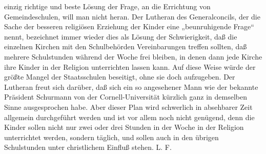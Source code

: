 einzig richtige und beste Lösung der Frage, an die Errichtung von Gemeindeschulen, will man nicht heran. Der Lutheran des Generalconcils, der die Sache der besseren religiösen Erziehung der Kinder eine „beunruhigende Frage“ nennt, bezeichnet immer wieder dies als Lösung der Schwierigkeit, daß die einzelnen Kirchen mit den Schulbehörden Vereinbarungen treffen sollten, daß mehrere Schulstunden während der Woche frei bleiben, in denen dann jede Kirche ihre Kinder in der Religion unterrichten lassen kann. Auf diese Weise würde der größte Mangel der Staatsschulen beseitigt, ohne sie doch aufzugeben. Der Lutheran freut sich darüber, daß sich ein so angesehener Mann wie der bekannte Präsident Schurmann von der Cornell-Universität kürzlich ganz in demselben Sinne ausgesprochen habe. Aber dieser Plan wird schwerlich in absehbarer Zeit allgemein durchgeführt werden und ist vor allem noch nicht genügend, denn die Kinder sollen nicht nur zwei oder drei Stunden in der Woche in der Religion unterrichtet werden, sondern täglich, und sollen auch in den übrigen Schulstunden unter christlichem Einfluß stehen. L. F.
